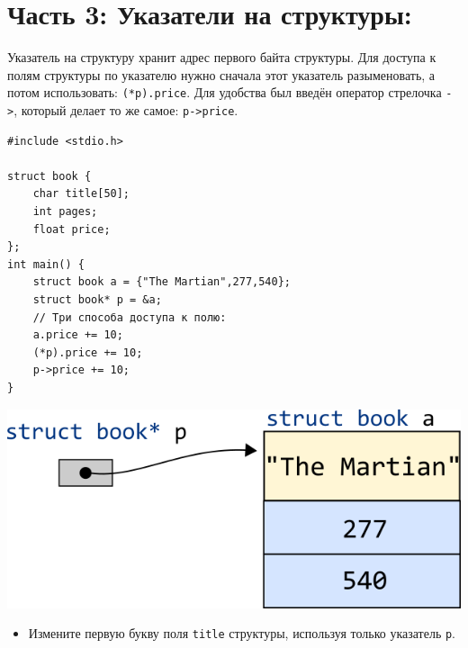 \documentclass{article}
\begin{document}
\section*{Часть 3: Указатели на структуры:}
Указатель на структуру хранит адрес первого байта структуры. Для доступа к полям структуры по указателю нужно сначала этот указатель разыменовать, а потом использовать: \texttt{(*p).price}. Для удобства был введён оператор стрелочка \texttt{->}, который делает то же самое: \texttt{p->price}.
\begin{multicols}{2}
\begin{lstlisting}
#include <stdio.h>

struct book {
    char title[50];
    int pages;
    float price;
};
int main() {
    struct book a = {"The Martian",277,540};
    struct book* p = &a;
    // Три способа доступа к полю:
    a.price += 10;
    (*p).price += 10;
    p->price += 10;
}
\end{lstlisting}

\vfill\null
\columnbreak

\begin{center}
\includegraphics[scale=0.6]{../images/structpointer2.png}
\end{center}
\end{multicols}

\begin{itemize}
\item Измените первую букву поля \texttt{title} структуры, используя только указатель \texttt{p}.
\end{itemize}
\end{document}
